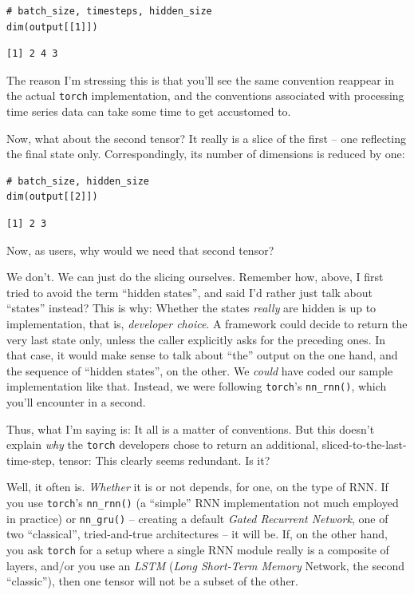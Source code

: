 \documentclass[
  letterpaper,
]{krantz}
\begin{document}
\begin{verbatim}
# batch_size, timesteps, hidden_size
dim(output[[1]])
\end{verbatim}

\begin{verbatim}
[1] 2 4 3
\end{verbatim}

The reason I'm stressing this is that you'll see the same convention
reappear in the actual \texttt{torch} implementation, and the
conventions associated with processing time series data can take some
time to get accustomed to.

Now, what about the second tensor? It really is a slice of the first --
one reflecting the final state only. Correspondingly, its number of
dimensions is reduced by one:

\begin{verbatim}
# batch_size, hidden_size
dim(output[[2]])
\end{verbatim}

\begin{verbatim}
[1] 2 3
\end{verbatim}

Now, as users, why would we need that second tensor?

We don't. We can just do the slicing ourselves. Remember how, above, I
first tried to avoid the term ``hidden states'', and said I'd rather
just talk about ``states'' instead? This is why: Whether the states
\emph{really} are hidden is up to implementation, that is,
\emph{developer choice}. A framework could decide to return the very
last state only, unless the caller explicitly asks for the preceding
ones. In that case, it would make sense to talk about ``the'' output on
the one hand, and the sequence of ``hidden states'', on the other. We
\emph{could} have coded our sample implementation like that. Instead, we
were following \texttt{torch}'s \texttt{nn\_rnn()}, which you'll
encounter in a second.

Thus, what I'm saying is: It all is a matter of conventions. But this
doesn't explain \emph{why} the \texttt{torch} developers chose to return
an additional, sliced-to-the-last-time-step, tensor: This clearly seems
redundant. Is it?

Well, it often is. \emph{Whether} it is or not depends, for one, on the
type of RNN. If you use \texttt{torch}'s \texttt{nn\_rnn()} (a
``simple'' RNN implementation not much employed in practice) or
\texttt{nn\_gru()} -- creating a default \emph{Gated Recurrent Network},
one of two ``classical'', tried-and-true architectures -- it will be.
If, on the other hand, you ask \texttt{torch} for a setup where a single
RNN module really is a composite of layers, and/or you use an
\emph{LSTM} (\emph{Long Short-Term Memory} Network, the second
``classic''), then one tensor will not be a subset of the other.
\end{document}
